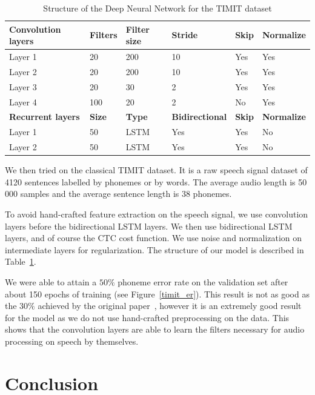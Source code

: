 \documentclass[11pt,a4paper]{article}
\begin{document}
\begin{table}[H]
	\centering
	\small
    \begin{tabular}{l l l l l l}
		\hline
		\textbf{Convolution layers} & \textbf{Filters} & \textbf{Filter size} & \textbf{Stride} & \textbf{Skip} & \textbf{Normalize} \\
		\hline
		Layer 1 & 20 & 200 & 10 & Yes & Yes \\
		Layer 2 & 20 & 200 & 10 & Yes & Yes \\
		Layer 3 & 20 & 30 & 2 & Yes & Yes \\
		Layer 4 & 100 & 20 & 2 & No & Yes \\
		\hline
		\textbf{Recurrent layers} & \textbf{Size} & \textbf{Type} & \textbf{Bidirectional} & \textbf{Skip} & \textbf{Normalize} \\
		\hline
		Layer 1 & 50 & LSTM & Yes & Yes & No \\
		Layer 2 & 50 & LSTM & Yes & Yes & No \\
		\hline
    \end{tabular}
	\caption{Structure of the Deep Neural Network for the TIMIT dataset}
	\label{params_timit}
\end{table}

We then tried on the classical TIMIT dataset. It is a raw speech signal dataset of 4120 sentences labelled by phonemes or by words. The average audio length is 50\,000 samples and the average sentence length is 38 phonemes.

To avoid hand-crafted feature extraction on the speech signal, we use convolution layers before the bidirectional LSTM layers. We then use bidirectional LSTM layers, and of course the CTC cost function. We use noise and normalization on intermediate layers for regularization. The structure of our model is described in Table~\ref{params_timit}.

We were able to attain a $50\%$ phoneme error rate on the validation set after about 150 epochs of training (see Figure~\ref{timit_er}). This result is not as good as the $30\%$ achieved by the original paper~\cite{graves2006connectionist}, however it is an extremely good result for the model as we do not use hand-crafted preprocessing on the data. This shows that the convolution layers are able to learn the filters necessary for audio processing on speech by themselves.

\section{Conclusion}
\end{document}
